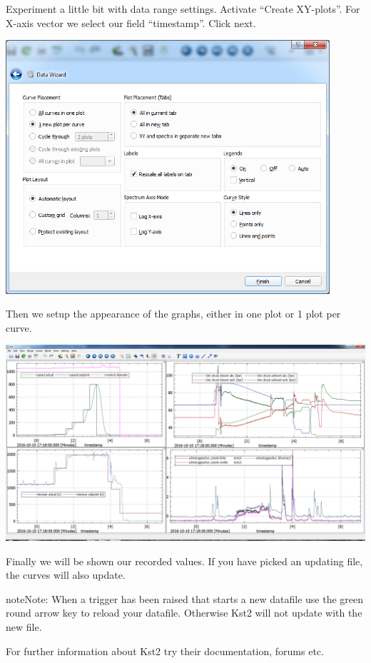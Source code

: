 \documentclass[a4paper,10pt,english]{sphinxmanual}
\begin{document}
Experiment a little bit with data range settings. Activate ``Create XY-plots''. For X-axis vector we select our field ``timestamp''. Click next.

{\hfill\includegraphics[width=12cm]{wiz7.png}\hfill}

Then we setup the appearance of the graphs, either in one plot or 1 plot per curve.

{\hfill\includegraphics[width=15cm]{offline.png}\hfill}

Finally we will be shown our recorded values. If you have picked an updating file, the curves will also update.

\begin{notice}{note}{Note:}
When a trigger has been raised that starts a new datafile use the green round arrow key to reload your datafile. Otherwise Kst2 will not update with the new file.
\end{notice}

For further information about Kst2 try their documentation, forums etc.
\end{document}
